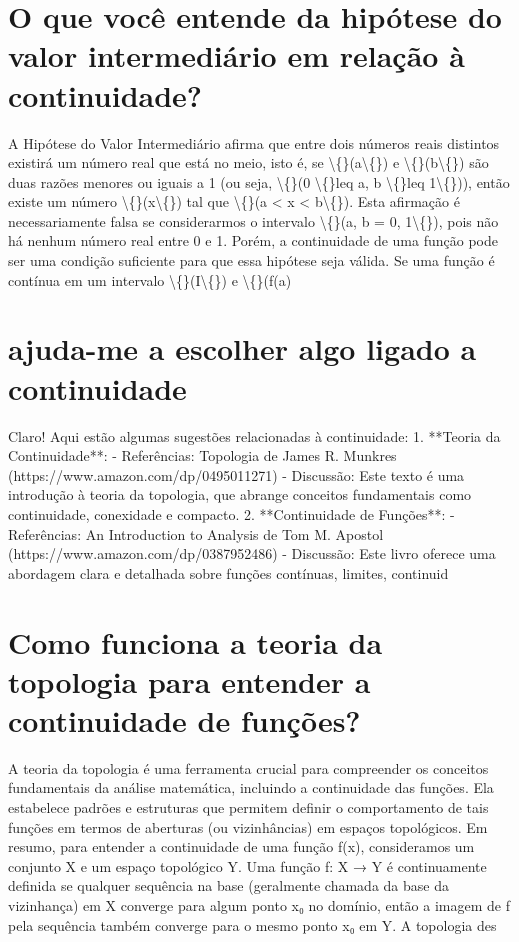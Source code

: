 \documentclass[11pt,a4paper]{article}
\begin{document}
\section{O que você entende da hipótese do valor intermediário em relação à continuidade?}
A Hipótese do Valor Intermediário afirma que entre dois números reais distintos existirá um número real que está no meio, isto é, se \textbackslash\{\}(a\textbackslash\{\}) e \textbackslash\{\}(b\textbackslash\{\}) são duas razões menores ou iguais a 1 (ou seja, \textbackslash\{\}(0 \textbackslash\{\}leq a, b \textbackslash\{\}leq 1\textbackslash\{\})), então existe um número \textbackslash\{\}(x\textbackslash\{\}) tal que \textbackslash\{\}(a < x < b\textbackslash\{\}). Esta afirmação é necessariamente falsa se considerarmos o intervalo \textbackslash\{\}(a, b = 0, 1\textbackslash\{\}), pois não há nenhum número real entre 0 e 1. Porém, a continuidade de uma função pode ser uma condição suficiente para que essa hipótese seja válida. Se uma função é contínua em um intervalo \textbackslash\{\}(I\textbackslash\{\}) e \textbackslash\{\}(f(a)

\section{ajuda-me a escolher algo ligado a continuidade}
Claro! Aqui estão algumas sugestões relacionadas à continuidade: 1. **Teoria da Continuidade**: - Referências: Topologia de James R. Munkres (https://www.amazon.com/dp/0495011271) - Discussão: Este texto é uma introdução à teoria da topologia, que abrange conceitos fundamentais como continuidade, conexidade e compacto. 2. **Continuidade de Funções**: - Referências: An Introduction to Analysis de Tom M. Apostol (https://www.amazon.com/dp/0387952486) - Discussão: Este livro oferece uma abordagem clara e detalhada sobre funções contínuas, limites, continuid

\section{Como funciona a teoria da topologia para entender a continuidade de funções?}
A teoria da topologia é uma ferramenta crucial para compreender os conceitos fundamentais da análise matemática, incluindo a continuidade das funções. Ela estabelece padrões e estruturas que permitem definir o comportamento de tais funções em termos de aberturas (ou vizinhâncias) em espaços topológicos. Em resumo, para entender a continuidade de uma função f(x), consideramos um conjunto X e um espaço topológico Y. Uma função f: X → Y é continuamente definida se qualquer sequência na base (geralmente chamada da base da vizinhança) em X converge para algum ponto x₀ no domínio, então a imagem de f pela sequência também converge para o mesmo ponto x₀ em Y. A topologia des
\end{document}
